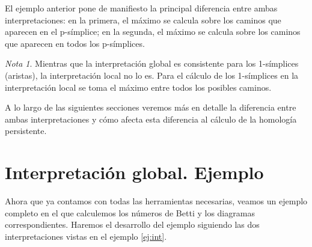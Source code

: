 \documentclass[12pt, a4paper, twoside]{book}
\numberwithin{equation}{section}
\theoremstyle{definition}
\theoremstyle{remark}
\newtheorem*{remark}{Nota}
\theoremstyle{plain}
\begin{document}
	El ejemplo anterior pone de manifiesto la principal diferencia 
	entre ambas interpretaciones: en la primera, el máximo se 
	calcula sobre los caminos que aparecen en el p-símplice; en la 
	segunda, el máximo se calcula sobre los caminos que aparecen 
	en todos los p-símplices.
	\begin{remark}
		Mientras que la interpretación global es consistente 
		para los 1-símplices (aristas), la interpretación 
		local no lo es. Para el cálculo de los 1-símplices en 
		la interpretación local se toma el máximo entre todos 
		los posibles caminos. 
	\end{remark}
	
	A lo largo de las siguientes secciones veremos más en detalle la 
	diferencia entre ambas interpretaciones y cómo afecta esta diferencia
	al cálculo de la homología persistente.

	\section{Interpretación global. Ejemplo}
	
	Ahora que ya contamos con todas las herramientas necesarias, veamos un ejemplo completo en el que calculemos los números de Betti y 
	los diagramas correspondientes. Haremos el desarrollo del ejemplo siguiendo las dos interpretaciones vistas en el ejemplo \ref{ej:int}.  
\end{document}
